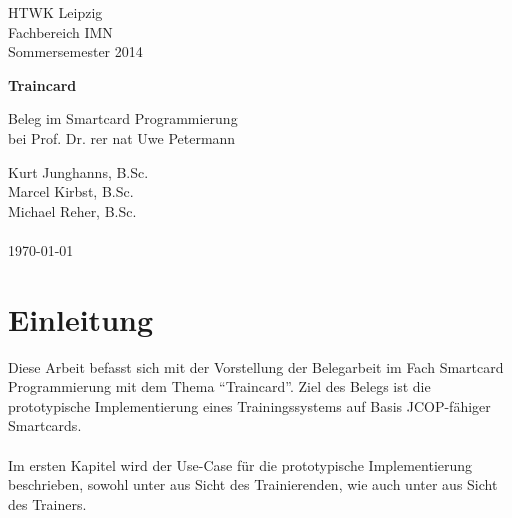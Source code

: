 \documentclass[a4paper,12pt]{scrartcl}
\begin{document}
 
\begin{titlepage}
\begin{small}
\vfill {HTWK Leipzig\\
Fachbereich IMN \\
Sommersemester 2014}
\end{small}
 
\begin{center}
\begin{Large}
\vfill {\textsf{\textbf{
Traincard\\
}}}
\end{Large}
Beleg im Smartcard Programmierung\\bei Prof. Dr. rer nat Uwe Petermann
\end{center}
 
\begin{small}

\vfill
Kurt Junghanns, B.Sc.\\
Marcel Kirbst, B.Sc. \\
Michael Reher, B.Sc.\\
\\
\today
\end{small}
 
\end{titlepage}
 
\tableofcontents
\clearpage
\listoffigures
\listoftables
\thispagestyle{empty}
 
\clearpage
\onehalfspacing
 
\pagestyle{plain}
 
\section{Einleitung}
\label{sec:0}
Diese Arbeit befasst sich mit der Vorstellung der Belegarbeit im Fach Smartcard Programmierung mit dem Thema ``Traincard''. 
Ziel des Belegs ist die prototypische Implementierung eines Trainingssystems auf Basis JCOP-fähiger Smartcards. 
\\
\\
Im ersten Kapitel  wird der Use-Case für die prototypische Implementierung beschrieben, sowohl unter  aus Sicht des Trainierenden, wie auch unter  aus Sicht des Trainers.
\end{document}

